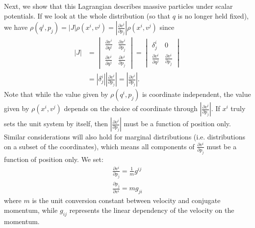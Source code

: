\documentclass[letterpaper]{article}
\begin{document}
Next, we show that this Lagrangian describes massive particles under scalar potentials. If we look at the whole distribution (so that $q$ is no longer held fixed), we have $\rho(q^i, p_j) = |J| \rho(x^i, v^j) = \left|\frac{\partial v^i}{\partial p_j}\right| \rho(x^i, v^j)$ since
\begin{equation}
\begin{aligned}
|J| &= \begin{vmatrix}
\frac{\partial x^i}{\partial q^j} & \frac{\partial x^i}{\partial p_j} \\
\frac{\partial v^i}{\partial q^j} & \frac{\partial v^i}{\partial p_j}
\end{vmatrix}
= \begin{vmatrix}
\delta^i_j & 0 \\
\frac{\partial v^i}{\partial q^j} & \frac{\partial v^i}{\partial p_j}
\end{vmatrix} \\
&= \left|\delta^i_j\right| \left|\frac{\partial v^i}{\partial p_j}\right| 
= \left|\frac{\partial v^i}{\partial p_j}\right|.
\end{aligned}
\end{equation}
Note that while the value given by $\rho(q^i, p_j)$ is coordinate independent, the value given by $\rho(x^i, v^j)$ depends on the choice of coordinate through $\left|\frac{\partial v^i}{\partial p_j}\right|$. If $x^i$ truly sets the unit system by itself, then $\left|\frac{\partial v^i}{\partial p_j}\right|$ must be a function of position only. Similar considerations will also hold for marginal distributions (i.e. distributions on a subset of the coordinates), which means all components of $\frac{\partial v^i}{\partial p_j}$ must be a function of position only. We set:
\begin{equation}
\begin{aligned}
\frac{\partial v^i}{\partial p_j} = \frac{1}{m} g^{ij} \\
\frac{\partial p_j}{\partial v^i} = m g_{ji}
\end{aligned}
\end{equation}
where $m$ is the unit conversion constant between velocity and conjugate momentum, while $g_{ij}$ represents the linear dependency of the velocity on the momentum. 
\end{document}
